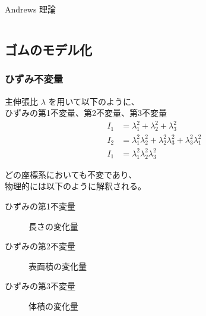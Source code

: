 \documentclass[aspectratio=169,11pt, dvipdfmx]{beamer}
\begin{document}
\begin{frame}
\begin{exampleblock}{Andrews 理論}
\begin{columns}[totalwidth=1\textwidth]
		\end{columns}
	\end{exampleblock}
\end{frame}





\subsection{ゴムのモデル化}

\begin{frame}
	\frametitle{ひずみ不変量}

	主伸張比 $\lambda$ を用いて以下のように、\\ひずみの第1不変量、第2不変量、第3不変量
		\begin{align*}
			I_1 &= \lambda_1^2 + \lambda_2^2 + \lambda_3^2 \\
			I_2 &= \lambda_1^2\lambda_2^2 + \lambda_2^2\lambda_3^2 + \lambda_3^2\lambda_1^2 \\
			I_1 &= \lambda_1^2\lambda_2^2\lambda_3^2
		\end{align*}

	どの座標系においても不変であり、\\物理的には以下のように解釈される。
	\begin{description}
		\item [ひずみの第1不変量]
		長さの変化量
		\item [ひずみの第2不変量]
		表面積の変化量
		\item [ひずみの第3不変量]
		体積の変化量
	\end{description}
\end{frame}
\end{document}

